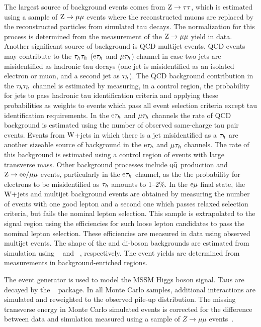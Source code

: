 The largest source of background events comes from $\mathrm{Z}\to\mathrm{\tau}\mathrm{\tau}$, which is estimated using a sample of $\mathrm{Z}\to\mathrm{\mu}\mathrm{\mu}$ events where the reconstructed muons are replaced by the reconstructed particles from simulated tau decays. The normalization for this process is determined from the measurement of the $\mathrm{Z}\to\mathrm{\mu}\mathrm{\mu}$ yield in data. 
Another significant source of background is QCD multijet events.
QCD events may contribute to the $\mathrm{\tau}_h\mathrm{\tau}_h$ ($\mathrm{e}\mathrm{\tau}_h$ and $\mathrm{\mu}\mathrm{\tau}_h$) channel
in case two jets are misidentified as hadronic tau decays (one jet is misidentified as an isolated electron or muon, and a second jet as $\mathrm{\tau}_h$).
The QCD background contribution in the $\mathrm{\tau}_h\mathrm{\tau}_h$ channel
is estimated by measuring, in a control region, the probability for jets to pass hadronic tau identification criteria
and applying these probabilities as weights to events which pass all event selection criteria except tau identification requirements.
In the $\mathrm{e}\mathrm{\tau}_h$ and $\mathrm{\mu}\mathrm{\tau}_h$ channels the rate of QCD background is estimated using the number of observed same-charge
tau pair events.
Events from $\mathrm{W}$+jets in which there is a jet misidentified as a $\mathrm{\tau}_h$ are another sizeable source of background in the $\mathrm{e}\mathrm{\tau}_h$ and $\mathrm{\mu}\mathrm{\tau}_h$ channels.
The rate of this background is estimated using a control region of events with large transverse mass.
Other background processes include $\mathrm{q}\mathrm{\bar{q}}$ production
and $\mathrm{Z}\to \mathrm{e}\mathrm{e}/\mathrm{\mu}\mathrm{\mu}$ events, particularly in the $\mathrm{e}\mathrm{\tau}_h$ channel, 
as the the probability for electrons to be misidentified as $\mathrm{\tau}_h$ amounts to 1--2\%.
In the $\mathrm{e}\mathrm{\mu}$ final state, the $\mathrm{W} +$jets and multijet background events are obtained by measuring the number of events with one good lepton and a second one which passes relaxed selection criteria, but fails the nominal lepton selection.
This sample is extrapolated to the signal region using the efficiencies
for such loose lepton candidates to pass the nominal lepton selection. These efficiencies
are measured in data using observed multijet events. The shape of the \ttbar  and di-boson backgrounds are estimated from simulation 
using \MADGRAPH~\cite{Alwall:2007st} and \PYTHIA~\cite{Pythia}, respectively. The event yields are determined from measurements in background-enriched regions.

The event generator \PYTHIA is used to model the MSSM Higgs boson signal.
Taus are decayed by the \TAUOLA~\cite{TAUOLA} package.
In all Monte Carlo  samples, additional interactions are simulated and reweighted to the observed pile-up distribution.  
The missing transverse energy in Monte Carlo simulated events is corrected for the difference between data and simulation 
measured using a sample of $Z\rightarrow\mu\mu$ events~\cite{CMS-EWK-WZ}.


